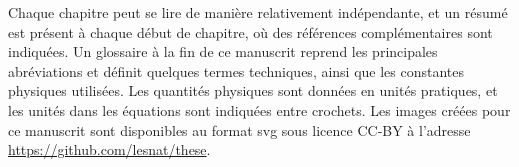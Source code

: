 \begin{refsection}
Chaque chapitre peut se lire de manière relativement indépendante, et un résumé est présent à chaque début de chapitre, où des références complémentaires sont indiquées. Un glossaire à la fin de ce manuscrit reprend les principales abréviations et définit quelques termes techniques, ainsi que les constantes physiques utilisées. Les quantités physiques sont données en unités pratiques, et les unités dans les équations sont indiquées entre crochets. Les images créées pour ce manuscrit sont disponibles au format svg sous licence CC-BY à l'adresse \href{https://github.com/lesnat/these}{https://github.com/lesnat/these}.

\newpage
\printbibliography[heading=subbibintoc]
\end{refsection}